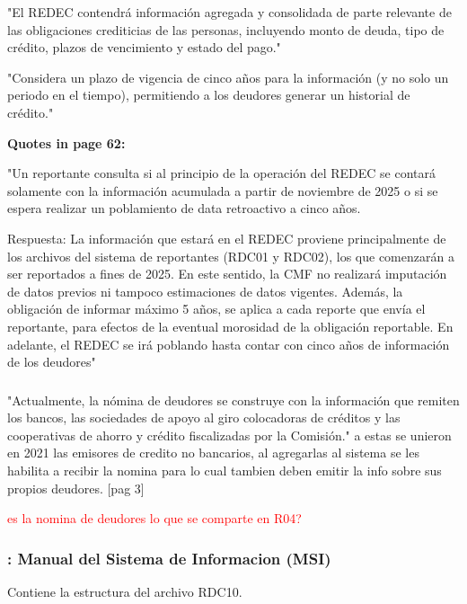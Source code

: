 \documentclass[12pt]{article}
\theoremstyle{plain}
\theoremstyle{plain}
\theoremstyle{definition}  %
\theoremstyle{remark}  %
\begin{document}
"El REDEC contendrá información agregada y consolidada de parte relevante de las obligaciones crediticias de las personas, incluyendo monto de deuda, tipo de crédito, plazos de vencimiento y estado del pago." 

"Considera un plazo de vigencia de cinco años para la información (y no solo un periodo en el tiempo), permitiendo a los deudores generar un historial de crédito."

\textbf{Quotes in page 62:} 

"Un reportante consulta si al principio de la operación del REDEC se contará solamente con la información acumulada a partir de noviembre de 2025 o si se espera realizar un poblamiento de data retroactivo a cinco años.  

Respuesta: La información que estará en el REDEC proviene principalmente de los archivos del sistema de reportantes (RDC01 y RDC02), los que comenzarán a ser reportados a fines de 2025. En este sentido, la CMF no realizará imputación de datos previos ni tampoco estimaciones de datos vigentes. Además, la obligación de informar máximo 5 años, se aplica a cada reporte que envía el reportante, para efectos de la eventual morosidad de la obligación reportable. En adelante, el REDEC se irá poblando hasta contar con cinco años de información de los deudores" 



\subsubsection{\textcite{cmf_cmf_2021}}

"Actualmente, la nómina de deudores se construye con la información que remiten los bancos, las sociedades de apoyo al giro colocadoras de créditos y las cooperativas de ahorro y crédito fiscalizadas por la Comisión." a estas se unieron en 2021 las emisores de credito no bancarios, al agregarlas al sistema se les habilita a recibir la nomina para lo cual tambien deben emitir la info sobre sus propios deudores.  [pag 3]

\textcolor{red}{es la nomina de deudores lo que se comparte en R04?} 


\subsubsection{\textcite{cmf_msi_2025}: Manual del Sistema de Informacion (MSI) }

Contiene la estructura del archivo RDC10. 
\end{document}
